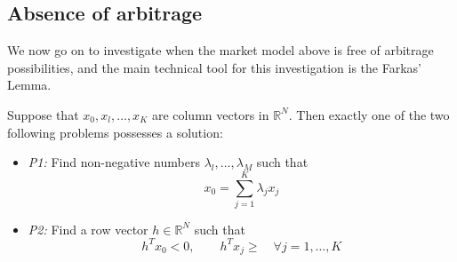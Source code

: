 \subsection{Absence of arbitrage}
We now go on to investigate when the market model above is free of arbitrage possibilities, and the main technical tool for this investigation is the Farkas' Lemma.
\begin{lemma}
    Suppose that $x_0,x_l,\dots,x_K$ are column vectors in $\mathbb{R}^N$. Then exactly one of the two following problems possesses a solution:
    \begin{itemize}
        \item \emph{P1:} Find non-negative numbers $\lambda_l,\dots,\lambda_M$ such that
        \begin{equation}
            x_0 = \sum^K_{j=1} \lambda_j x_j
        \end{equation}
        \item \emph{P2:} Find a row vector $h\in\mathbb{R}^N$ such that
        \begin{equation}\label{ineq}
            h^Tx_0<0, \qquad h^Tx_j\ge \quad\forall j=1,\dots,K
        \end{equation}
    \end{itemize}
\end{lemma}
